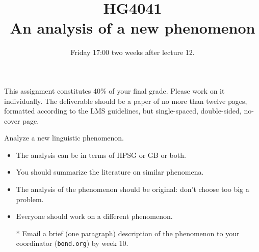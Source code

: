 \documentclass[a4paper,12pt]{article}
\title{HG4041 \\ 
  An analysis of a new phenomenon}
\date{Friday 17:00 two weeks after lecture 12.}
\begin{document}
\maketitle

This assignment constitutes 40\% of your final grade.  Please work on
it individually.  The deliverable should be a paper of no more than
twelve pages, formatted according to the LMS guidelines, but
single-spaced, double-sided, no-cover page.

\bigskip\bigskip\bigskip

Analyze a new linguistic phenomenon.
\begin{itemize}
\item The analysis can be in terms of HPSG or GB or both.
\item You should summarize the literature on similar phenomena.
\item The analysis of the phenomenon should be original: don't choose too big a problem.
\item Everyone should work on a different phenomenon.
\item[*] Email a brief (one paragraph) description of the phenomenon
  to your coordinator (\texttt{bond\@ieee.org}) by week 10.
\end{itemize}
\end{document}
